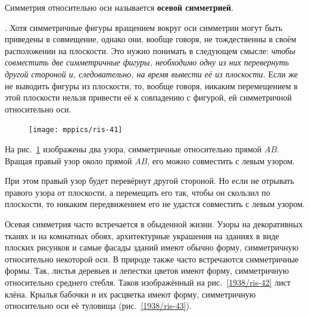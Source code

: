 \documentclass[twoside]{book}
\makeatletter
\newcommand{\rindex}[2][\imki@jobname]{%
  \index[#1]{\detokenize{#2}}%
}
\makeatother
\begin{document}
Симметрия относительно оси называется \rindex{осевая симметрия}\textbf{осевой симметрией}. 

\smallskip
{}.
Хотя симметричные фигуры вращением вокруг оси симметрии могут быть приведены в совмещение, однако они, вообще говоря, не тождественны в своём расположении на плоскости.
Это нужно понимать в следующем смысле:
\emph{чтобы совместить две симметричные фигуры, необходимо одну из них перевернуть другой стороной и, следовательно, на время вывести её из плоскости.}
Если же не выводить фигуры из плоскости, то, вообще говоря, никаким перемещением в этой плоскости нельзя привести её к совпадению с фигурой, ей симметричной относительно оси.

\begin{figure}
\centering
\texttt{[image: mppics/ris-41]}
\caption{}\label{1938/ris-41}
\end{figure}

На рис.~\ref{1938/ris-41} изображены два узора, симметричные относительно прямой $AB$.
Вращая правый узор около прямой $AB$, его можно совместить с левым узором.

При этом правый узор будет перевёрнут другой стороной.
Но если не отрывать правого узора от плоскости, а перемещать его так, чтобы он скользил по плоскости, то никаким передвижением его не удастся совместить с левым узором.

Осевая симметрия часто встречается в обыденной жизни.
Узоры на декоративных тканях и на комнатных обоях, архитектурные украшения на зданиях в виде плоских рисунков и самые фасады зданий имеют обычно форму, симметричную относительно некоторой оси.
В природе также часто встречаются симметричные формы.
Так, листья деревьев и лепестки цветов имеют форму, симметричную относительно среднего стебля.
Таков изображённый на рис.~\ref{1938/ris-42} лист клёна.
Крылья бабочки и их расцветка имеют форму, симметричную относительно оси её туловища (рис.~\ref{1938/ris-43}).
\end{document}
